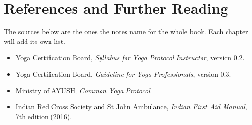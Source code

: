 \chapter{References and Further Reading}

The sources below are the ones the notes name for the whole book. Each chapter will add its own list.

\begin{itemize}
\item Yoga Certification Board, \emph{Syllabus for Yoga Protocol Instructor}, version 0.2.
\item Yoga Certification Board, \emph{Guideline for Yoga Professionals}, version 0.3.
\item Ministry of AYUSH, \emph{Common Yoga Protocol}.
\item Indian Red Cross Society and St John Ambulance, \emph{Indian First Aid Manual}, 7th edition (2016).
\end{itemize}

